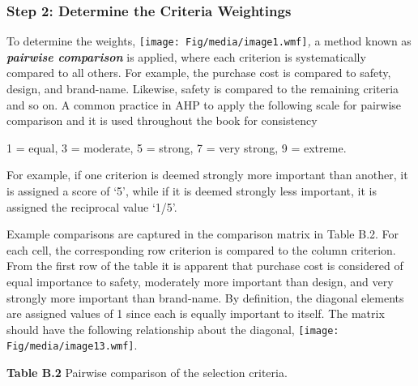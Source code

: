 \subsubsection*{Step 2: Determine the Criteria
Weightings}\label{step-2-determine-the-criteria-weightings}

To determine the weights, \texttt{[image: Fig/media/image1.wmf]}\emph{,}
a method known as \emph{\textbf{pairwise comparison}} is applied, where
each criterion is systematically compared to all others. For example,
the purchase cost is compared to safety, design, and brand-name.
Likewise, safety is compared to the remaining criteria and so on. A
common practice in AHP to apply the following scale for pairwise
comparison and it is used throughout the book for consistency

1 = equal, 3 = moderate, 5 = strong, 7 = very strong, 9 = extreme.

For example, if one criterion is deemed strongly more important than
another, it is assigned a score of `5', while if it is deemed strongly
less important, it is assigned the reciprocal value `1/5'.

Example comparisons are captured in the comparison matrix in Table B.2.
For each cell, the corresponding row criterion is compared to the column
criterion. From the first row of the table it is apparent that purchase
cost is considered of equal importance to safety, moderately more
important than design, and very strongly more important than brand-name.
By definition, the diagonal elements are assigned values of 1 since each
is equally important to itself. The matrix should have the following
relationship about the diagonal,
\texttt{[image: Fig/media/image13.wmf]}.

\textbf{Table B.2} Pairwise comparison of the selection criteria.

